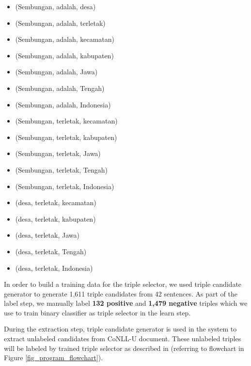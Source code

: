 \documentclass[conference,compsoc,12pt]{IEEEtran}
\begin{document}
\begin{itemize}
\item (Sembungan, adalah, desa) 
\item (Sembungan, adalah, terletak)
\item (Sembungan, adalah, kecamatan)
\item (Sembungan, adalah, kabupaten)
\item (Sembungan, adalah, Jawa)
\item (Sembungan, adalah, Tengah)
\item (Sembungan, adalah, Indonesia)
\item (Sembungan, terletak, kecamatan) 
\item (Sembungan, terletak, kabupaten) 
\item (Sembungan, terletak, Jawa) 
\item (Sembungan, terletak, Tengah)
\item (Sembungan, terletak, Indonesia) 
\item (desa, terletak, kecamatan)
\item (desa, terletak, kabupaten)
\item (desa, terletak, Jawa)
\item (desa, terletak, Tengah)
\item (desa, terletak, Indonesia)
\end{itemize}

In order to build a training data for the triple selector, we used triple candidate generator to generate 1,611 triple candidates from 42 sentences. As part of the label step, we manually label \textbf{132 positive} and \textbf{1,479 negative} triples which we use to train binary classifier as triple selector in the learn step.

During the extraction step, triple candidate generator is used in the system to extract unlabeled candidates from CoNLL-U document. These unlabeled triples will be labeled by trained triple selector as described in  (referring to flowchart in Figure \ref{fig_program_flowchart}).
\end{document}
